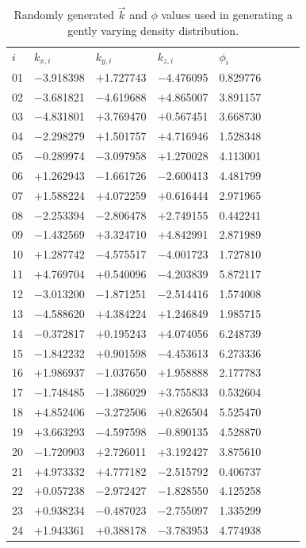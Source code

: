 \documentclass[fleq,usenatbib]{mnras}
\begin{document}
\begin{table}
	\centering
	\caption{Randomly generated $\vec{k}$ and $\phi$ values used in generating 
             a gently varying density distribution.}
	\label{tab:modes}
	\begin{tabular}{llllllll} %
		\hline
		$i$ & $k_{x,i}$ & $k_{y,i}$ & $k_{z,i}$ & $\phi_i$ \\
01 & $-$3.918398 & $+$1.727743 & $-$4.476095 & 0.829776 \\
02 & $-$3.681821 & $-$4.619688 & $+$4.865007 & 3.891157 \\
03 & $-$4.831801 & $+$3.769470 & $+$0.567451 & 3.668730 \\
04 & $-$2.298279 & $+$1.501757 & $+$4.716946 & 1.528348 \\
05 & $-$0.289974 & $-$3.097958 & $+$1.270028 & 4.113001 \\
06 & $+$1.262943 & $-$1.661726 & $-$2.600413 & 4.481799 \\
07 & $+$1.588224 & $+$4.072259 & $+$0.616444 & 2.971965 \\
08 & $-$2.253394 & $-$2.806478 & $+$2.749155 & 0.442241 \\
09 & $-$1.432569 & $+$3.324710 & $+$4.842991 & 2.871989 \\
10 & $+$1.287742 & $-$4.575517 & $-$4.001723 & 1.727810 \\
11 & $+$4.769704 & $+$0.540096 & $-$4.203839 & 5.872117 \\
12 & $-$3.013200 & $-$1.871251 & $-$2.514416 & 1.574008 \\
13 & $-$4.588620 & $+$4.384224 & $+$1.246849 & 1.985715 \\
14 & $-$0.372817 & $+$0.195243 & $+$4.074056 & 6.248739 \\
15 & $-$1.842232 & $+$0.901598 & $-$4.453613 & 6.273336 \\
16 & $+$1.986937 & $-$1.037650 & $+$1.958888 & 2.177783 \\
17 & $-$1.748485 & $-$1.386029 & $+$3.755833 & 0.532604 \\
18 & $+$4.852406 & $-$3.272506 & $+$0.826504 & 5.525470 \\
19 & $+$3.663293 & $-$4.597598 & $-$0.890135 & 4.528870 \\
20 & $-$1.720903 & $+$2.726011 & $+$3.192427 & 3.875610 \\
21 & $+$4.973332 & $+$4.777182 & $-$2.515792 & 0.406737 \\
22 & $+$0.057238 & $-$2.972427 & $-$1.828550 & 4.125258 \\
23 & $+$0.938234 & $-$0.487023 & $-$2.755097 & 1.335299 \\
24 & $+$1.943361 & $+$0.388178 & $-$3.783953 & 4.774938 \\
		\hline
	\end{tabular}
\end{table}
\end{document}
